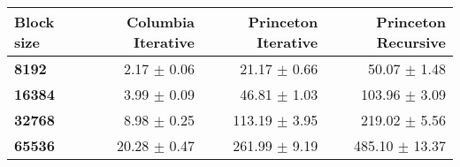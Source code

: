 \begin{tabular}{lrrr}\toprule
\textbf{Block size}  & \textbf{Columbia Iterative} & \textbf{Princeton Iterative} & \textbf{Princeton Recursive}\\\midrule
\textbf{8192}  & 2.17 $\pm$ 0.06 & 21.17 $\pm$ 0.66 & 50.07 $\pm$ 1.48\\
\textbf{16384}  & 3.99 $\pm$ 0.09 & 46.81 $\pm$ 1.03 & 103.96 $\pm$ 3.09\\
\textbf{32768}  & 8.98 $\pm$ 0.25 & 113.19 $\pm$ 3.95 & 219.02 $\pm$ 5.56\\
\textbf{65536} & 20.28 $\pm$ 0.47 & 261.99 $\pm$ 9.19 & 485.10 $\pm$ 13.37\\
\bottomrule
\end{tabular}
